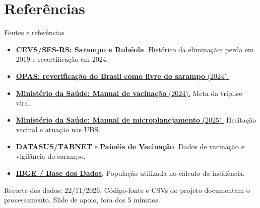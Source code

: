 \documentclass[aspectratio=169]{beamer}
\newcommand{\fonte}[1]{\vfill{\tiny\color{InfGray}#1\par}}
\begin{document}
\section*{Referências}
\begin{frame}[t]{Fontes e referências}
\vspace{3mm}
\small
\begin{itemize}\setlength{\itemsep}{2mm}
\item \href{https://www.cevs.rs.gov.br/sarampo/1000}{\textbf{CEVS/SES-RS: Sarampo e Rubéola}.} Histórico da eliminação: perda em 2019 e recertificação em 2024.
\item \href{https://www.paho.org/pt/noticias/12-11-2024-opas-verifica-que-brasil-e-mais-uma-vez-um-pais-livre-do-sarampo}{\textbf{OPAS: reverificação do Brasil como livre do sarampo} (2024).}
\item \href{https://www.gov.br/saude/pt-br/centrais-de-conteudo/publicacoes/guias-e-manuais/2024/manual-de-normas-e-procedimentos-para-vacinacao.pdf/@@download/file}{\textbf{Ministério da Saúde: Manual de vacinação} (2024).} Meta da tríplice viral.
\item \href{https://www.gov.br/saude/pt-br/centrais-de-conteudo/publicacoes/guias-e-manuais/2025/manual-de-microplanejamento-para-atividades-de-vacinacao-municipios-e-ubs.pdf}{\textbf{Ministério da Saúde: Manual de microplanejamento} (2025).} Hesitação vacinal e atuação nas UBS.
\item \href{https://datasus.saude.gov.br/informacoes-de-saude-tabnet/}{\textbf{DATASUS/TABNET}} e \href{https://www.gov.br/saude/pt-br/vacinacao/paineis-de-vacinacao}{\textbf{Painéis de Vacinação}}. Dados de vacinação e vigilância do sarampo.
\item \href{https://basedosdados.org/dataset/d30222ad-7a5c-4778-a1ec-f0785371d1ca}{\textbf{IBGE / Base dos Dados}}. População utilizada no cálculo da incidência.
\end{itemize}
\fonte{Recorte dos dados: 22/11/2026. Código-fonte e CSVs do projeto documentam o processamento. Slide de apoio, fora dos 5 minutos.}
\end{frame}
\end{document}

